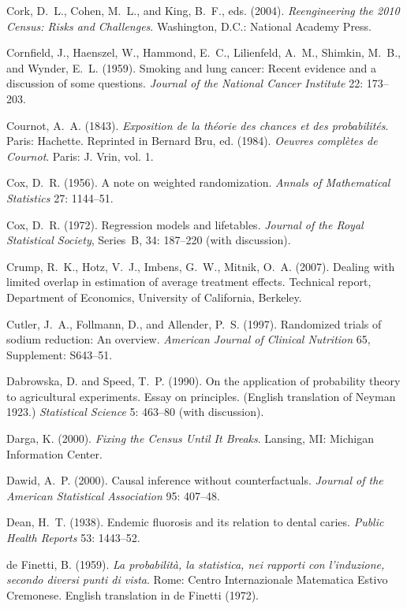 \smallskip\noindent
Cork, D.~L., Cohen, M.~L., and King, B.~F., eds. (2004).
{\it Reengineering the 2010 Census: Risks and Challenges\/}.
Washington, D.C.: National Academy Press.

\smallskip\noindent
Cornfield, J., Haenszel, W., Hammond, E.~C., Lilienfeld, A.~M., Shimkin, M.~B., and Wynder, E.~L. (1959).
Smoking and lung cancer: Recent evidence and a discussion of some questions.
{\it Journal of the National Cancer Institute\/} 22: 173--203.

\smallskip\noindent
Cournot, A.~A. (1843).
{\it Exposition de la th\'eorie des chances et des probabilit\'es\/}.
Paris: Hachette.
Reprinted in Bernard Bru, ed. (1984). {\it Oeuvres com\-pl\`etes de Cournot\/}.
Paris: J. Vrin, vol. 1.

\smallskip\noindent
Cox, D.~R. (1956).
A note on weighted randomization.
{\it Annals of Mathematical Statistics\/} 27: 1144--51.

\smallskip\noindent
Cox, D.~R. (1972).
Regression models and lifetables.
{\it Journal of the Royal Statistical Society\/}, Series~B, 34: 187--220 (with discussion).

\smallskip\noindent
Crump, R.~K., Hotz, V.~J., Imbens, G.~W., Mitnik, O.~A. (2007).
Dealing with limited overlap in estimation of average treatment effects.
Technical report, Department of Economics, University of California, Berkeley.

\smallskip\noindent
Cutler, J.~A., Follmann, D., and Allender, P.~S. (1997).
Randomized trials of sodium reduction: An overview.
{\it American Journal of Clinical Nutrition\/} 65, Supplement: S643--51.

\smallskip\noindent
Dabrowska, D. and Speed, T.~P. (1990).
On the application of probability theory to agricultural experiments. Essay on principles.
(English translation of Neyman 1923.)
{\it Statistical Science\/} 5: 463--80 (with discussion).

\smallskip\noindent
Darga, K. (2000).
{\it Fixing the Census Until It Breaks\/}.
Lansing, MI: Michigan Information Center.

\smallskip\noindent
Dawid, A.~P. (2000).
Causal inference without counterfactuals.
{\it Journal of the American Statistical Association\/} 95: 407--48.

\smallskip\noindent
Dean, H.~T. (1938).
Endemic fluorosis and its relation to dental caries.
{\it Public Health Reports\/} 53: 1443--52.

\smallskip\noindent
de Finetti, B. (1959).
{\it La probabilit{\`a}, la statistica, nei
rapporti con l'indu\-zione, secondo diversi punti di vista\/}.
Rome: Centro Internazionale Matematica Estivo Cremonese.
English translation in de Finetti (1972).

